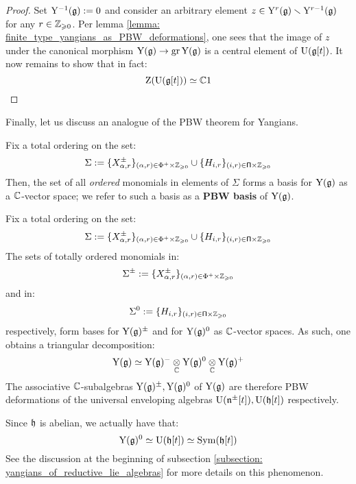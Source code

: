             \begin{proof}
                Set $\mathrm{Y}^{-1}(\mathfrak{g}) := 0$ and consider an arbitrary element $z \in \mathrm{Y}^r(\mathfrak{g}) \smallsetminus \mathrm{Y}^{r - 1}(\mathfrak{g})$ for any $r \in \mathbb{Z}_{\geqslant 0}$. Per lemma \ref{lemma: finite_type_yangians_as_PBW_deformations}, one sees that the image of $z$ under the canonical morphism $\mathrm{Y}(\mathfrak{g}) \to \operatorname{gr} \mathrm{Y}(\mathfrak{g})$ is a central element of $\mathrm{U}(\mathfrak{g}[t])$. It now remains to show that in fact:
                    $$\mathrm{Z}( \mathrm{U}(\mathfrak{g}[t]) ) \simeq \mathbb{C} 1$$
            \end{proof}

        Finally, let us discuss an analogue of the PBW theorem for Yangians.
        \begin{theorem} \label{theorem: PBW_bases_for_finite_type_yangians}
            \cite[Proposition 12.1.8]{chari_pressley_quantum_groups} Fix a total ordering on the set:
                $$\Sigma := \{X_{\alpha, r}^{\pm}\}_{(\alpha, r) \in \Phi^+ \x \Z_{\geq 0}} \cup \{H_{i, r}\}_{(i, r) \in \simpleroots \x \Z_{\geq 0}}$$
            Then, the set of all \textit{ordered} monomials in elements of $\Sigma$ forms a basis for $\mathrm{Y}(\mathfrak{g})$ as a $\mathbb{C}$-vector space; we refer to such a basis as a \textbf{PBW basis} of $\mathrm{Y}(\mathfrak{g})$. 
        \end{theorem}
        \begin{corollary} \label{coro: triangular_decompositions_of_finite_type_yangians}
            Fix a total ordering on the set:
                $$\Sigma := \{X_{\alpha, r}^{\pm}\}_{(\alpha, r) \in \Phi^+ \x \Z_{\geq 0}} \cup \{H_{i, r}\}_{(i, r) \in \simpleroots \x \Z_{\geq 0}}$$
            The sets of totally ordered monomials in:
                $$\Sigma^{\pm} := \{X_{\alpha, r}^{\pm}\}_{(\alpha, r) \in \Phi^+ \x \Z_{\geq 0}}$$
            and in:
                $$\Sigma^0 := \{H_{i, r}\}_{(i, r) \in \simpleroots \x \Z_{\geq 0}}$$
            respectively, form bases for $\mathrm{Y}(\mathfrak{g})^{\pm}$ and for $\mathrm{Y}(\mathfrak{g})^0$ as $\mathbb{C}$-vector spaces. As such, one obtains a triangular decomposition:
                $$\rmY(\g) \cong \rmY(\g)^- \tensor_{\bbC} \rmY(\g)^0 \tensor_{\bbC} \rmY(\g)^+$$
            The associative $\mathbb{C}$-subalgebras $\mathrm{Y}(\mathfrak{g})^{\pm}, \mathrm{Y}(\mathfrak{g})^0$ of $\mathrm{Y}(\mathfrak{g})$ are therefore PBW deformations of the universal enveloping algebras $\mathrm{U}(\mathfrak{n}^{\pm}[t]), \mathrm{U}(\mathfrak{h}[t])$ respectively. 
        \end{corollary}
        \begin{remark}
            Since $\mathfrak{h}$ is abelian, we actually have that:
                $$\mathrm{Y}(\mathfrak{g})^0 \simeq \mathrm{U}(\mathfrak{h}[t]) \simeq \mathrm{Sym}(\mathfrak{h}[t])$$
            See the discussion at the beginning of subsection \ref{subsection: yangians_of_reductive_lie_algebras} for more details on this phenomenon. 
        \end{remark}

